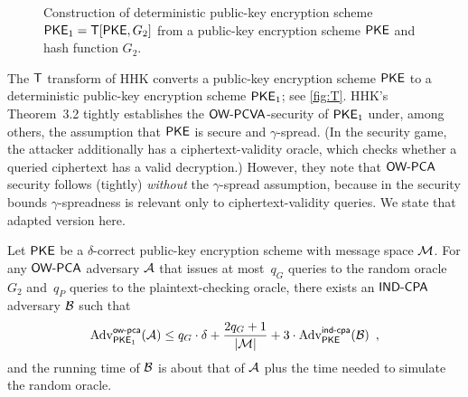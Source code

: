 \documentclass{iacrcc}
\begin{document}
\begin{figure}[h]
\centering
{}
\caption{Construction of deterministic public-key encryption scheme $\textsf{\upshape\mdseries PKE}_1=\textsf{\upshape\mdseries T}[\textsf{\upshape\mdseries PKE}, G_2]$ from a public-key encryption scheme $\textsf{\upshape\mdseries PKE}$ and hash function $G_2$.}
\label{fig:T}
\end{figure}

The $\textsf{\upshape\mdseries T}$ transform of HHK converts a public-key encryption scheme
$\textsf{\upshape\mdseries PKE}$ to a deterministic public-key encryption scheme $\textsf{\upshape\mdseries PKE}_1$; see
\autoref{fig:T}.  HHK's Theorem~3.2 tightly establishes the
$\textsf{\upshape\mdseries OW-PCVA}$-security of $\textsf{\upshape\mdseries PKE}_1$ under, among others, the assumption
that $\textsf{\upshape\mdseries PKE}$ is \INDCPA secure and $\gamma$-spread. (In the \OWPCVA
security game, the attacker additionally has a ciphertext-validity
oracle, which checks whether a queried ciphertext has a valid
decryption.)  However, they note that $\textsf{\upshape\mdseries OW-PCA}$ security follows
(tightly) \emph{without} the $\gamma$-spread assumption, because in
the security bounds $\gamma$-spreadness is relevant only to
ciphertext-validity queries.  We state that adapted version here.

\begin{lemma}
  \label{lem:T}
  Let $\textsf{\upshape\mdseries PKE}$ be a $\delta$-correct public-key encryption scheme with
  message space $\mathcal{M}$. For any $\textsf{\upshape\mdseries OW-PCA}$ adversary $\mathcal{A}$ that
  issues at most~$q_G$ queries to the random oracle~$G_2$ and~$q_P$
  queries to the plaintext-checking oracle, there exists an $\textsf{\upshape\mdseries IND-CPA}$
  adversary $\mathcal{B}$ such that
  \[
  \mathrm{Adv}^{\textsf{\upshape\mdseries \textsf{\upshape\mdseries ow-pca}}}_{\textsf{\upshape\mdseries PKE}_1}(\mathcal{A}) \leq q_G \cdot \delta + \frac{2 q_G
    + 1}{|\mathcal{M}|} + 3 \cdot \mathrm{Adv}^{\textsf{\upshape\mdseries \textsf{\upshape\mdseries ind-cpa}}}_{\textsf{\upshape\mdseries PKE}}(\mathcal{B}) \enspace
  ,
  \]
  and the running time of $\mathcal{B}$ is about that of $\mathcal{A}$
  plus the time needed to simulate the random oracle.
\end{lemma}
\end{document}
